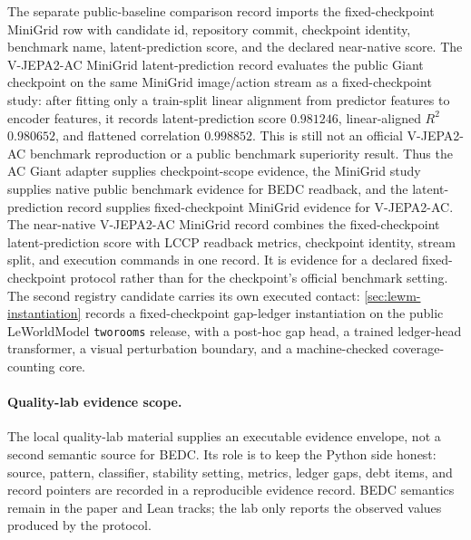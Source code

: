 The separate public-baseline comparison record imports the fixed-checkpoint
MiniGrid row with candidate id, repository commit, checkpoint identity,
benchmark name, latent-prediction score, and the declared near-native score.  The
V-JEPA2-AC MiniGrid latent-prediction record evaluates the public Giant
checkpoint on the same MiniGrid image/action stream as a fixed-checkpoint
study: after fitting only a train-split linear alignment from predictor
features to encoder features, it records latent-prediction score $0.981246$,
linear-aligned $R^2$ $0.980652$, and flattened correlation $0.998852$.  This
is still not an official V-JEPA2-AC benchmark reproduction or a public
benchmark superiority result.  Thus the AC Giant adapter supplies
checkpoint-scope evidence, the MiniGrid study supplies native public benchmark
evidence for BEDC readback, and the latent-prediction record supplies
fixed-checkpoint MiniGrid evidence for V-JEPA2-AC.
The near-native V-JEPA2-AC MiniGrid record combines the fixed-checkpoint
latent-prediction score with LCCP readback metrics, checkpoint identity,
stream split, and execution commands in one record.  It is evidence for a
declared fixed-checkpoint protocol rather than for the checkpoint's official
benchmark setting.  The second registry candidate carries its own executed
contact: \autoref{sec:lewm-instantiation} records a fixed-checkpoint
gap-ledger instantiation on the public LeWorldModel \texttt{tworooms}
release, with a post-hoc gap head, a trained ledger-head transformer, a
visual perturbation boundary, and a machine-checked coverage-counting core.

\paragraph{Quality-lab evidence scope.}
The local quality-lab material supplies an executable evidence envelope, not a
second semantic source for BEDC.  Its role is to keep the Python side honest:
source, pattern, classifier, stability setting, metrics, ledger gaps, debt
items, and record pointers are recorded in a reproducible evidence record.  BEDC
semantics remain in the paper and Lean tracks; the lab only reports the
observed values produced by the protocol.
